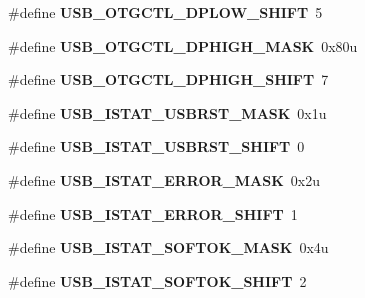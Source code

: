 \begin{DoxyCompactItemize}
\#define {\bfseries U\+S\+B\+\_\+\+O\+T\+G\+C\+T\+L\+\_\+\+D\+P\+L\+O\+W\+\_\+\+S\+H\+I\+FT}~5
\item 
\mbox{\label{group___u_s_b___register___masks_ga58ba9522df4e9a18c7efa0472837c30c}} 
\#define {\bfseries U\+S\+B\+\_\+\+O\+T\+G\+C\+T\+L\+\_\+\+D\+P\+H\+I\+G\+H\+\_\+\+M\+A\+SK}~0x80u
\item 
\mbox{\label{group___u_s_b___register___masks_ga898efaea515cbbb64826b7685082665f}} 
\#define {\bfseries U\+S\+B\+\_\+\+O\+T\+G\+C\+T\+L\+\_\+\+D\+P\+H\+I\+G\+H\+\_\+\+S\+H\+I\+FT}~7
\item 
\mbox{\label{group___u_s_b___register___masks_gaacafc35a1c208555b284f9f086708686}} 
\#define {\bfseries U\+S\+B\+\_\+\+I\+S\+T\+A\+T\+\_\+\+U\+S\+B\+R\+S\+T\+\_\+\+M\+A\+SK}~0x1u
\item 
\mbox{\label{group___u_s_b___register___masks_gad463e743b6bdd9589a499bf654703da0}} 
\#define {\bfseries U\+S\+B\+\_\+\+I\+S\+T\+A\+T\+\_\+\+U\+S\+B\+R\+S\+T\+\_\+\+S\+H\+I\+FT}~0
\item 
\mbox{\label{group___u_s_b___register___masks_gaef490eac989ee78a88372bcbf3b029c6}} 
\#define {\bfseries U\+S\+B\+\_\+\+I\+S\+T\+A\+T\+\_\+\+E\+R\+R\+O\+R\+\_\+\+M\+A\+SK}~0x2u
\item 
\mbox{\label{group___u_s_b___register___masks_gaa4afff6c8a78b6b44f3e314dd4746892}} 
\#define {\bfseries U\+S\+B\+\_\+\+I\+S\+T\+A\+T\+\_\+\+E\+R\+R\+O\+R\+\_\+\+S\+H\+I\+FT}~1
\item 
\mbox{\label{group___u_s_b___register___masks_gab45774502290aab38038a19110e8558b}} 
\#define {\bfseries U\+S\+B\+\_\+\+I\+S\+T\+A\+T\+\_\+\+S\+O\+F\+T\+O\+K\+\_\+\+M\+A\+SK}~0x4u
\item 
\mbox{\label{group___u_s_b___register___masks_gae58407103a8cebfc9c4a8e8c7f08fddb}} 
\#define {\bfseries U\+S\+B\+\_\+\+I\+S\+T\+A\+T\+\_\+\+S\+O\+F\+T\+O\+K\+\_\+\+S\+H\+I\+FT}~2
\item 
\mbox{\label{group___u_s_b___register___masks_ga12db7650592f7e48ae702b71d1728c98}} 

\end{DoxyCompactItemize}
